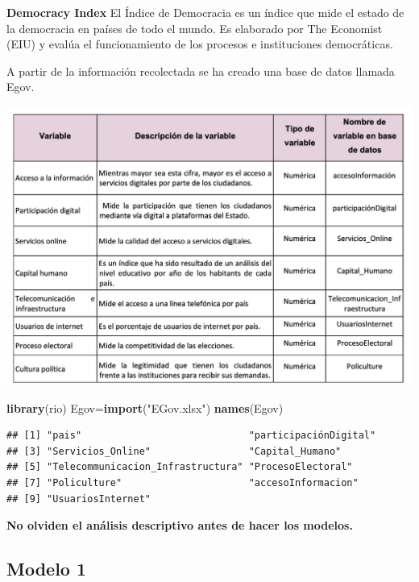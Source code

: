 \documentclass[
]{article}
\newenvironment{Shaded}{\begin{snugshade}}{\end{snugshade}}
\newcommand{\FunctionTok}[1]{\textcolor[rgb]{0.13,0.29,0.53}{\textbf{#1}}}
\newcommand{\NormalTok}[1]{#1}
\newcommand{\OtherTok}[1]{\textcolor[rgb]{0.56,0.35,0.01}{#1}}
\newcommand{\StringTok}[1]{\textcolor[rgb]{0.31,0.60,0.02}{#1}}
\begin{document}
\textbf{Democracy Index} El Índice de Democracia es un índice que mide
el estado de la democracia en países de todo el mundo. Es elaborado por
The Economist (EIU) y evalúa el funcionamiento de los procesos e
instituciones democráticas.

A partir de la información recolectada se ha creado una base de datos
llamada Egov.

\begin{center}\includegraphics[width=0.8\linewidth]{PD12_diccionarioEgov} \end{center}

\begin{Shaded}
\begin{Highlighting}[]
\FunctionTok{library}\NormalTok{(rio)}
\NormalTok{Egov}\OtherTok{=}\FunctionTok{import}\NormalTok{(}\StringTok{"EGov.xlsx"}\NormalTok{)}
\FunctionTok{names}\NormalTok{(Egov)}
\end{Highlighting}
\end{Shaded}

\begin{verbatim}
## [1] "pais"                             "participaciónDigital"            
## [3] "Servicios_Online"                 "Capital_Humano"                  
## [5] "Telecommunicacion_Infrastructura" "ProcesoElectoral"                
## [7] "Policulture"                      "accesoInformacion"               
## [9] "UsuariosInternet"
\end{verbatim}

\textbf{No olviden el análisis descriptivo antes de hacer los modelos.}

\subsection{\texorpdfstring{\textbf{Modelo
1}}{Modelo 1}}\label{modelo-1}
\end{document}
